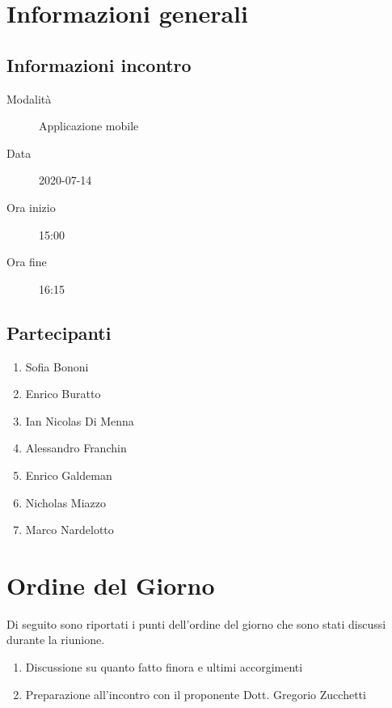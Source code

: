 \documentclass{article}
\begin{document}


\section{Informazioni generali}%
\label{sec:informazioni_generali}

\subsection{Informazioni incontro}%
\label{sub:informazioni_incontro}

\begin{description}
  \item[Modalità] Applicazione mobile 
  \item[Data] 2020-07-14
  \item[Ora inizio] 15:00
  \item[Ora fine] 16:15
\end{description}

\subsection{Partecipanti}%
\label{sub:partecipanti}

\begin{enumerate}
  \item Sofia Bononi
  \item Enrico Buratto
  \item Ian Nicolas Di Menna
  \item Alessandro Franchin
  \item Enrico Galdeman
  \item Nicholas Miazzo
  \item Marco Nardelotto
\end{enumerate}

\section{Ordine del Giorno}%
\label{ordine_del_giorno}
Di seguito sono riportati i punti dell'ordine del giorno che sono stati discussi durante la riunione.
\begin{enumerate}
  \item Discussione su quanto fatto finora e ultimi accorgimenti
  \item Preparazione all'incontro con il proponente Dott. Gregorio Zucchetti
\end{enumerate}
\end{document}
